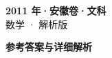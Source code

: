 \documentclass[zihao=-4, a4paper]{ctexart}
\begin{document}
\begin{center}
  {\Large\bfseries 2011 年·安徽卷·文科}\\[4pt]
  {\large 数学 · 解析版}
\end{center}
\medskip
{}

\clearpage
{}
\begin{center}{\Large\bfseries 参考答案与详细解析}\end{center}
\medskip

\end{document}
